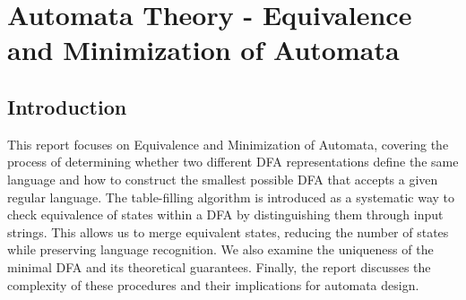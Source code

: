 \documentclass{article}
\begin{document}
\section{Automata Theory - Equivalence and Minimization of Automata}

\subsection{Introduction}\label{sec:intro}
This report focuses on Equivalence and Minimization of Automata, covering the process of determining whether two different DFA representations define the same language and how to construct the smallest possible DFA that accepts a given regular language. The table-filling algorithm is introduced as a systematic way to check equivalence of states within a DFA by distinguishing them through input strings. This allows us to merge equivalent states, reducing the number of states while preserving language recognition. We also examine the uniqueness of the minimal DFA and its theoretical guarantees. Finally, the report discusses the complexity of these procedures and their implications for automata design.
\end{document}
